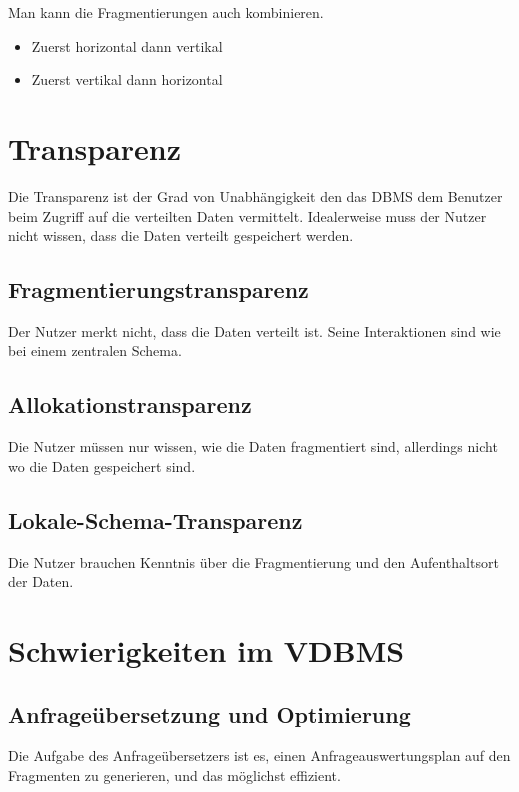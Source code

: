 Man kann die Fragmentierungen auch kombinieren.

\begin{itemize}
    \item Zuerst horizontal dann vertikal
    \item Zuerst vertikal dann horizontal
\end{itemize}

\section{Transparenz}

Die Transparenz ist der Grad von Unabhängigkeit den das DBMS dem Benutzer beim Zugriff auf die verteilten Daten vermittelt.
Idealerweise muss der Nutzer nicht wissen, dass die Daten verteilt gespeichert werden.

\subsection{Fragmentierungstransparenz}

Der Nutzer merkt nicht, dass die Daten verteilt ist. Seine Interaktionen sind wie bei einem zentralen Schema.

\subsection{Allokationstransparenz}

Die Nutzer müssen nur wissen, wie die Daten fragmentiert sind, allerdings nicht wo die Daten gespeichert sind.

\subsection{Lokale-Schema-Transparenz}

Die Nutzer brauchen Kenntnis über die Fragmentierung und den Aufenthaltsort der Daten.

\section{Schwierigkeiten im VDBMS}

\subsection{Anfrageübersetzung und Optimierung}

Die Aufgabe des Anfrageübersetzers ist es, einen Anfrageauswertungsplan auf den Fragmenten zu generieren, und das möglichst effizient.

